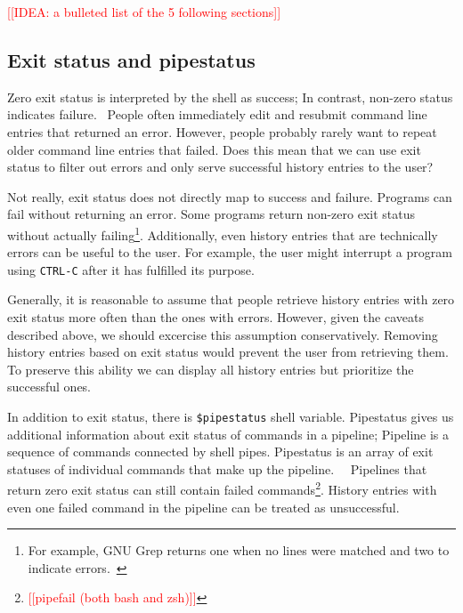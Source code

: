 \documentclass[thesis=M,english]{FITthesis}[2012/10/20]
\newcommand{\redtext}[1]{\textcolor{red}{[[#1]]}}
\let\myCite\cite
\renewcommand\cite{\unskip~\myCite}
\begin{document}
\redtext{IDEA: a bulleted list of the 5 following sections}

\subsection{Exit status and pipestatus}

Zero exit status is interpreted by the shell as success; In contrast, non-zero status indicates failure.\cite{bashman} People often immediately edit and resubmit command line entries that returned an error. However, people probably rarely want to repeat older command line entries that failed. Does this mean that we can use exit status to filter out errors and only serve successful history entries to the user?

Not really, exit status does not directly map to success and failure. Programs can fail without returning an error. Some programs return non-zero exit status without actually failing\footnote{For example, GNU Grep returns one when no lines were matched and two to indicate errors.\cite{man-grep}}. 
Additionally, even history entries that are technically errors can be useful to the user. For example, the user might interrupt a program using \verb|CTRL-C| after it has fulfilled its purpose.

Generally, it is reasonable to assume that people retrieve history entries with zero exit status more often than the ones with errors. However, given the caveats described above, we should excercise this assumption conservatively. Removing history entries based on exit status would prevent the user from retrieving them. To preserve this ability we can display all history entries but prioritize the successful ones.


In addition to exit status, there is \verb|$pipestatus| shell variable. Pipestatus gives us additional information about exit status of commands in a pipeline; Pipeline is a sequence of commands connected by shell pipes. Pipestatus is an array of exit statuses of individual commands that make up the pipeline.\cite{bashman}\cite{zshdocs} Pipelines that return zero exit status can still contain failed commands\footnote{\redtext{pipefail (both bash and zsh)}}. History entries with even one failed command in the pipeline can be treated as unsuccessful.
 
\end{document}

